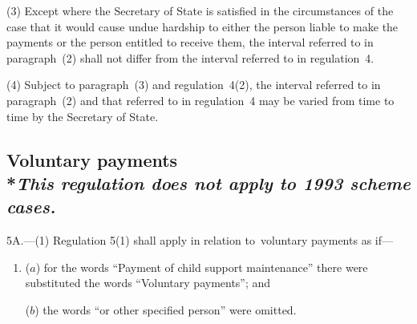 \documentclass[12pt,a4paper]{article}
\begin{document}
%
%

(3) Except where the Secretary of State is satisfied in the circumstances of the case that it would cause undue hardship to either the person liable to make the payments or the person entitled to receive them, the interval referred to in paragraph~(2) shall not differ from the interval referred to in regulation~4.

(4) Subject to paragraph~(3) and regulation~4(2), the interval referred to in paragraph~(2) and that referred to in regulation~4 may be varied from time to time by the Secretary of State.


\subsection[5A. Voluntary payments]{Voluntary payments\\*\emph{This regulation does not apply to 1993 scheme cases.}}

5A.---(1)  Regulation 5(1) shall apply in relation to~voluntary payments as if—
\begin{enumerate}\item[]
($a$) for the words “Payment of child support maintenance” there were substituted the words “Voluntary payments”; and

($b$) the words “or other specified person” were omitted.
\end{enumerate}
\end{document}
